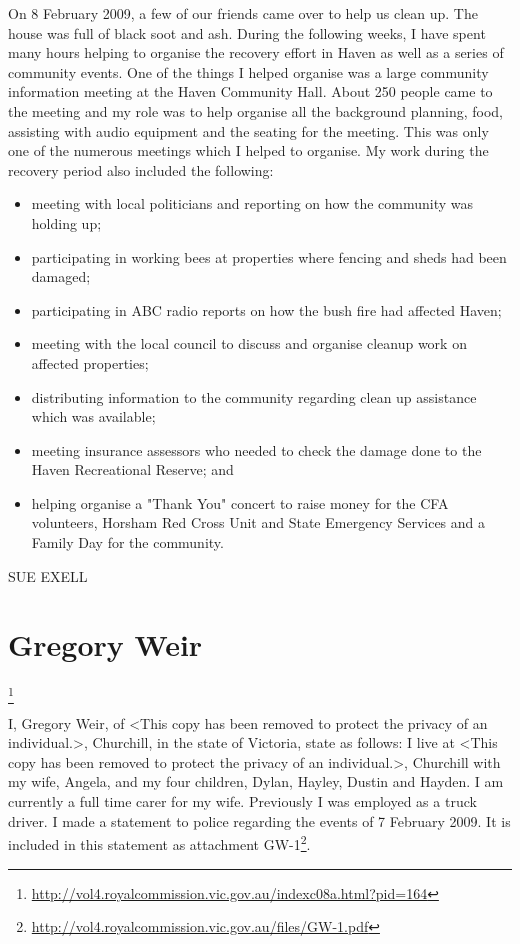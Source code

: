 \documentclass[a4paper]{article}
\begin{document}
    On 8 February 2009, a few of our friends came over to help us clean up. The house was full of black soot and ash.
    During the following weeks, I have spent many hours helping to organise the recovery effort in Haven as well as a series of community events. One of the things I helped organise was a large community information meeting at the Haven Community Hall. About 250 people came to the meeting and my role was to help organise all the background planning, food, assisting with audio equipment and the seating for the meeting. This was only one of the numerous meetings which I helped to organise. My work during the recovery period also included the following:
    \begin{itemize}
        \item meeting with local politicians and reporting on how the community was holding up;
        \item participating in working bees at properties where fencing and sheds had been damaged;
        \item participating in ABC radio reports on how the bush fire had affected Haven;
        \item meeting with the local council to discuss and organise cleanup work on affected properties;
        \item distributing information to the community regarding clean up assistance which was available;
        \item meeting insurance assessors who needed to check the damage done to the Haven Recreational Reserve; and
        \item helping organise a "Thank You" concert to raise money for the CFA volunteers, Horsham Red Cross Unit and State Emergency Services and a Family Day for the community.
    \end{itemize}
    SUE EXELL

\section{Gregory Weir}

    \let\thefootnote\relax\footnote{\url{http://vol4.royalcommission.vic.gov.au/indexc08a.html?pid=164}}

    I, Gregory Weir, of <This copy has been removed to protect the privacy of an individual.>, Churchill, in the state of Victoria, state as follows:
    I live at <This copy has been removed to protect the privacy of an individual.>, Churchill with my wife, Angela, and my four children, Dylan, Hayley, Dustin and Hayden.
    I am currently a full time carer for my wife. Previously I was employed as a truck driver.
    I made a statement to police regarding the events of 7 February 2009. It is included in this statement as attachment GW-1\footnote{\url{http://vol4.royalcommission.vic.gov.au/files/GW-1.pdf}}.
\end{document}
